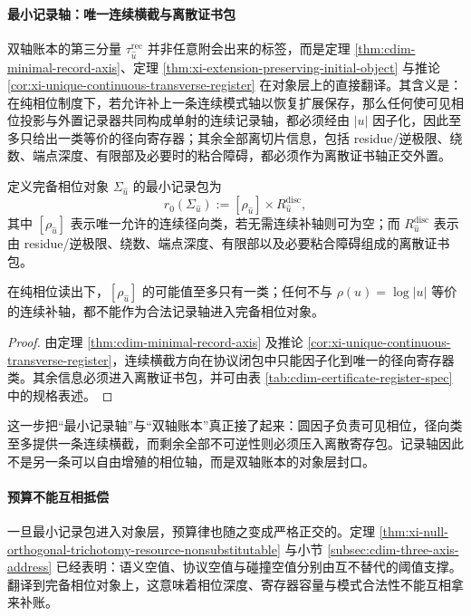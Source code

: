 \paragraph{最小记录轴：唯一连续横截与离散证书包}
双轴账本的第三分量 \(\tau^{\mathrm{rec}}_{\hat u}\) 并非任意附会出来的标签，而是定理 \ref{thm:cdim-minimal-record-axis}、定理 \ref{thm:xi-extension-preserving-initial-object} 与推论 \ref{cor:xi-unique-continuous-transverse-register} 在对象层上的直接翻译。其含义是：在纯相位制度下，若允许补上一条连续模式轴以恢复扩展保存，那么任何使可见相位投影与外置记录器共同构成单射的连续记录轴，都必须经由 \(|u|\) 因子化，因此至多只给出一类等价的径向寄存器；其余全部离切片信息，包括 residue/逆极限、绕数、端点深度、有限部及必要时的粘合障碍，都必须作为离散证书轴正交外置。

\begin{definition}[最小记录包]\label{def:unit-circle-complete-phase-minimal-recorder}
定义完备相位对象 \(\Sigma_{\hat u}\) 的最小记录包为
\[
r_0(\Sigma_{\hat u})
:=
[\rho_{\hat u}]\times R^{\mathrm{disc}}_{\hat u},
\]
其中 \([\rho_{\hat u}]\) 表示唯一允许的连续径向类，若无需连续补轴则可为空；而 \(R^{\mathrm{disc}}_{\hat u}\) 表示由 residue/逆极限、绕数、端点深度、有限部以及必要粘合障碍组成的离散证书包。
\end{definition}

\begin{proposition}[连续横截的唯一性]\label{prop:unit-circle-complete-phase-recorder-uniqueness}
在纯相位读出下，\([\rho_{\hat u}]\) 的可能值至多只有一类；任何不与 \(\rho(u)=\log|u|\) 等价的连续补轴，都不能作为合法记录轴进入完备相位对象。
\end{proposition}
\begin{proof}
由定理 \ref{thm:cdim-minimal-record-axis} 及推论 \ref{cor:xi-unique-continuous-transverse-register}，连续横截方向在协议闭包中只能因子化到唯一的径向寄存器类。其余信息必须进入离散证书包，并可由表 \ref{tab:cdim-certificate-register-spec} 中的规格表述。
\end{proof}

这一步把“最小记录轴”与“双轴账本”真正接了起来：圆因子负责可见相位，径向类至多提供一条连续横截，而剩余全部不可逆性则必须压入离散寄存包。记录轴因此不是另一条可以自由增殖的相位轴，而是双轴账本的对象层封口。

\paragraph{预算不能互相抵偿}
一旦最小记录包进入对象层，预算律也随之变成严格正交的。定理 \ref{thm:xi-null-orthogonal-trichotomy-resource-nonsubstitutable} 与小节 \ref{subsec:cdim-three-axis-address} 已经表明：语义空值、协议空值与碰撞空值分别由互不替代的阈值支撑。翻译到完备相位对象上，这意味着相位深度、寄存器容量与模式合法性不能互相拿来补账。

